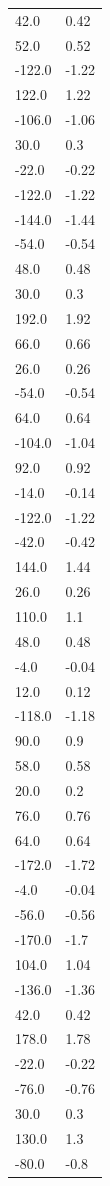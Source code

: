 \begin{longtable}{ll}
42.0 & 0.42 \\
52.0 & 0.52 \\
-122.0 & -1.22 \\
122.0 & 1.22 \\
-106.0 & -1.06 \\
30.0 & 0.3 \\
-22.0 & -0.22 \\
-122.0 & -1.22 \\
-144.0 & -1.44 \\
-54.0 & -0.54 \\
48.0 & 0.48 \\
30.0 & 0.3 \\
192.0 & 1.92 \\
66.0 & 0.66 \\
26.0 & 0.26 \\
-54.0 & -0.54 \\
64.0 & 0.64 \\
-104.0 & -1.04 \\
92.0 & 0.92 \\
-14.0 & -0.14 \\
-122.0 & -1.22 \\
-42.0 & -0.42 \\
144.0 & 1.44 \\
26.0 & 0.26 \\
110.0 & 1.1 \\
48.0 & 0.48 \\
-4.0 & -0.04 \\
12.0 & 0.12 \\
-118.0 & -1.18 \\
90.0 & 0.9 \\
58.0 & 0.58 \\
20.0 & 0.2 \\
76.0 & 0.76 \\
64.0 & 0.64 \\
-172.0 & -1.72 \\
-4.0 & -0.04 \\
-56.0 & -0.56 \\
-170.0 & -1.7 \\
104.0 & 1.04 \\
-136.0 & -1.36 \\
42.0 & 0.42 \\
178.0 & 1.78 \\
-22.0 & -0.22 \\
-76.0 & -0.76 \\
30.0 & 0.3 \\
130.0 & 1.3 \\
-80.0 & -0.8 \\

\end{longtable}
